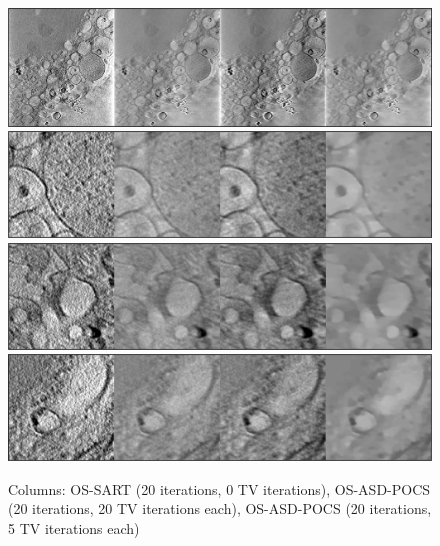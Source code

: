 \begin{figure}
\begin{center}

\includegraphics[width=\textwidth]{Applications/Diamond1_full.png} 
\includegraphics[width=\textwidth]{Applications/Diamond1zoom1.png} 
\includegraphics[width=\textwidth]{Applications/Diamond1zoom2.png} 
\includegraphics[width=\textwidth]{Applications/Diamond1zoom3.png} 

\end{center}

\caption{\label{fig:OStv}Columns: OS-SART (20 iterations, 0 TV iterations), OS-ASD-POCS (20 iterations, 20 TV iterations each), OS-ASD-POCS (20 iterations, 5 TV iterations each)} 
\end{figure}
